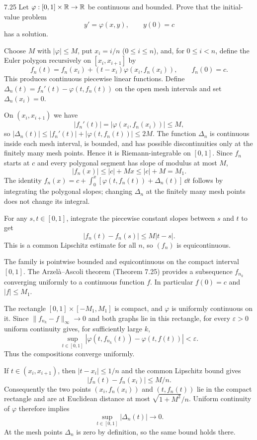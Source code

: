 \documentclass[11pt, oneside]{article}
\begin{document}
\begin{exercise}{7.25}
Let $\varphi:[0, 1]\times\mathbb{R}\to\mathbb{R}$ be continuous and bounded. Prove that the initial-value problem
\[
 y'=\varphi(x, y), \qquad y(0)=c
\]
has a solution.
\end{exercise}
\begin{solution}
Choose $M$ with $|\varphi|\le M$, put $x_i=i/n$ ($0\le i\le n$), and, for $0\le i<n$, define the Euler polygon recursively on $[x_i, x_{i+1}]$ by
\[
 f_n(t)=f_n(x_i)+(t-x_i)\varphi(x_i, f_n(x_i)), \qquad f_n(0)=c.
\]
This produces continuous piecewise linear functions. Define $\Delta_n(t)=f_n'(t)-\varphi(t, f_n(t))$ on the open mesh intervals and set $\Delta_n(x_i)=0$.

On $(x_i, x_{i+1})$ we have
\[
 |f_n'(t)|=|\varphi(x_i, f_n(x_i))|\le M,
\]
so $|\Delta_n(t)|\le|f_n'(t)|+|\varphi(t, f_n(t))|\le2M$. The function $\Delta_n$ is continuous inside each mesh interval, is bounded, and has possible discontinuities only at the finitely many mesh points. Hence it is Riemann-integrable on $[0, 1]$. Since $f_n$ starts at $c$ and every polygonal segment has slope of modulus at most $M$,
\[
 |f_n(x)|\le|c|+Mx\le|c|+M=M_1.
\]
The identity $f_n(x)=c+\int_0^x[\varphi(t, f_n(t))+\Delta_n(t)]\,\dd t$ follows by integrating the polygonal slopes; changing $\Delta_n$ at the finitely many mesh points does not change its integral.

For any $s, t\in[0, 1]$, integrate the piecewise constant slopes between $s$ and $t$ to get
\[
 |f_n(t)-f_n(s)|\le M|t-s|.
\]
This is a common Lipschitz estimate for all $n$, so $(f_n)$ is equicontinuous.

The family is pointwise bounded and equicontinuous on the compact interval $[0, 1]$. The Arzelà--Ascoli theorem (Theorem 7.25) provides a subsequence $f_{n_k}$ converging uniformly to a continuous function $f$. In particular $f(0)=c$ and $|f|\le M_1$.

The rectangle $[0, 1]\times[-M_1, M_1]$ is compact, and $\varphi$ is uniformly continuous on it. Since $\|f_{n_k}-f\|_\infty\to0$ and both graphs lie in this rectangle, for every $\varepsilon>0$ uniform continuity gives, for sufficiently large $k$,
\[
 \sup_{t\in[0, 1]}|\varphi(t, f_{n_k}(t))-\varphi(t, f(t))|<\varepsilon.
\]
Thus the compositions converge uniformly.

If $t\in(x_i, x_{i+1})$, then $|t-x_i|\le1/n$ and the common Lipschitz bound gives
\[
 |f_n(t)-f_n(x_i)|\le M/n.
\]
Consequently the two points $(x_i, f_n(x_i))$ and $(t, f_n(t))$ lie in the compact rectangle and are at Euclidean distance at most $\sqrt{1+M^2}/n$. Uniform continuity of $\varphi$ therefore implies
\[
 \sup_{t\in[0, 1]}|\Delta_n(t)|\longrightarrow0.
\]
At the mesh points $\Delta_n$ is zero by definition, so the same bound holds there.


\end{solution}
\end{document}
